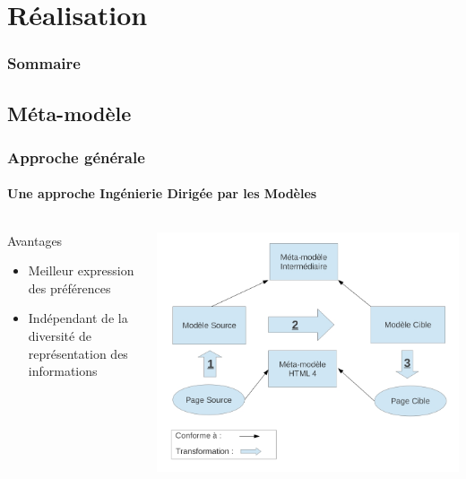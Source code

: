 \documentclass[]{beamer}
\begin{document}
\section{Réalisation}
\begin{frame}
  \frametitle{Sommaire}
\end{frame}

\subsection{Méta-modèle}

\begin{frame}
	\frametitle{Approche générale}
	\framesubtitle{Une approche Ingénierie Dirigée par les Modèles}
	\begin{columns}
		\begin{column}{4cm}
			\begin{block}{Avantages}
				\begin{itemize}
					\item Meilleur expression des préférences
					\item Indépendant de la diversité de représentation des informations
				\end{itemize}
			\end{block}
		\end{column}
		\begin{column}{6cm}
		\includegraphics[scale=0.3]{img/workflow-adaptation.jpg}
		\end{column}		
	\end{columns}
\end{frame}
\end{document}
